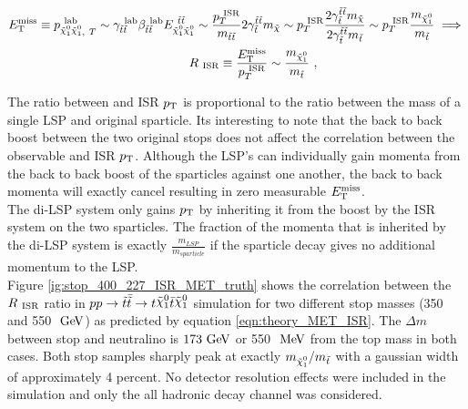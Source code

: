 \begin{align}
\MET \equiv p_{\ninoone\ninoone,~T}^{~\mathrm{lab}} \sim \gamma_{\stop\stop}^{~\mathrm{lab}} \beta_{\stop\stop}^{~\mathrm{lab}} E_{\ninoone\ninoone}^{~\stop\stop} 
\sim \frac{\PTISR}{m_{\stop\stop}} 2\gamma_{\stop}^{\stop\stop} m_{\tilde{\chi}} \sim
\PTISR \frac{ 2\gamma_{\stop}^{\stop\stop} m_{\tilde{\chi}} }{ 2\gamma_{\stop}^{\stop\stop} m_{\stop} } \sim
\PTISR \frac{m_{\ninoone}}{m_{\stop}}\implies\\
\RISR \equiv \frac{\MET}{\PTISR} \sim \frac{m_{\ninoone}}{m_{\stop}}~,\quad\quad\quad\quad\quad\quad\quad\quad\quad\quad\quad\quad
\label{eqn:theory_MET_ISR}
\end{align}

\indent The ratio between \MET and ISR $p_{\mathrm{T}}$ is proportional to the ratio between the mass of a single LSP and original sparticle.  Its interesting to note that the back to back boost between the two original stops does not affect the correlation between the observable \MET and ISR $p_{\mathrm{T}}$.  Although the LSP's can individually gain momenta from the back to back boost of the sparticles against one another, the back to back momenta will exactly cancel resulting in zero measurable $E_{\mathrm{T}}^{\mathrm{miss}}$.  \\

\indent The di-LSP system only gains $p_{\mathrm{T}}$ by inheriting it from the boost by the ISR system on the two sparticles.  The fraction of the momenta that is inherited by the di-LSP system is exactly $\frac{m_{LSP}}{m_{sparticle}}$ if the sparticle decay gives no additional momentum to the LSP.  \\

\indent Figure \ref{ig:stop_400_227_ISR_MET_truth} shows the correlation between the $R_{~\mathrm{ISR}}$ ratio in $p p \rightarrow \antibar{\stop} \rightarrow t\ninoone\tbar\ninoone$ simulation for two different stop masses (350 and 550 $\gev$) as predicted by equation \ref{eqn:theory_MET_ISR}.  The $\Delta m$ between stop and neutralino is $173 \gev$ or 550 $\mev$ from the top mass in both cases.  Both stop samples sharply peak at exactly $m_{\ninoone}/m_{\stop}$ with a gaussian width of approximately 4 percent.  No detector resolution effects were included in the simulation and only the all hadronic decay channel was considered. \\

